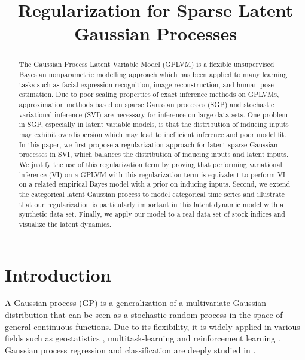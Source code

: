 \documentclass{article}
\title{Regularization for Sparse Latent Gaussian Processes}
\begin{document}
	
	\maketitle
	
\begin{abstract}
The Gaussian Process Latent Variable Model (GPLVM) is a flexible unsupervised Bayesian nonparametric modelling approach which has been applied to many learning tasks such as facial expression recognition, image reconstruction, and human pose estimation. Due to poor scaling properties of exact inference methods on GPLVMs, approximation methods based on sparse Gaussian processes (SGP) and stochastic variational inference (SVI) are necessary for inference on large data sets. One problem in SGP, especially in latent variable models, is that the distribution of inducing inputs may exhibit overdispersion which may lead to inefficient inference and poor model fit. In this paper, we first propose a regularization approach for latent sparse Gaussian processes in SVI, which balances the distribution of inducing inputs and latent inputs. We justify the use of this regularization term by proving that performing variational inference (VI) on a GPLVM with this regularization term is equivalent to perform VI on a related empirical Bayes model with a prior on inducing inputs. Second, we extend the categorical latent Gaussian process to model categorical time series and illustrate that our regularization is particularly important in this latent dynamic model with a synthetic data set. Finally, we apply our model to a real data set of stock indices and visualize the latent dynamics.
\end{abstract}

\section{Introduction}
A Gaussian process (GP) is a generalization of a multivariate Gaussian distribution that can be seen as a stochastic random process in the space of general continuous functions. Due to its flexibility, it is widely applied in various fields such as geostatistics \citep{Cressie_1993}, multitask-learning \citep{Banerjee_2008} and reinforcement learning \citep{Rasmussen_2004}. Gaussian process regression and classification are deeply studied in \cite{Rasmussen_2005}.
\end{document}
